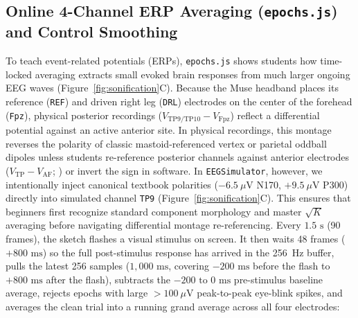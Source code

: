 \documentclass[11pt]{article}
\begin{document}
\subsection{Online 4-Channel ERP Averaging (\texttt{epochs.js}) and Control Smoothing}
To teach event-related potentials (ERPs), \texttt{epochs.js} shows students how time-locked averaging extracts small evoked brain responses from much larger ongoing EEG waves \citep{luck2014introduction,krigolson2017choosing} (Figure~\ref{fig:sonification}C). Because the Muse headband places its reference (\texttt{REF}) and driven right leg (\texttt{DRL}) electrodes on the center of the forehead (\texttt{Fpz}), physical posterior recordings ($V_{\text{TP9/TP10}} - V_{\text{Fpz}}$) reflect a differential potential against an active anterior site. In physical recordings, this montage reverses the polarity of classic mastoid-referenced vertex or parietal oddball dipoles unless students re-reference posterior channels against anterior electrodes ($V_{\text{TP}} - V_{\text{AF}}$; \citealp{krigolson2017choosing}) or invert the sign in software. In \texttt{EEGSimulator}, however, we intentionally inject canonical textbook polarities ($-6.5\ \mu\text{V}$ N170, $+9.5\ \mu\text{V}$ P300) directly into simulated channel \texttt{TP9} (Figure~\ref{fig:sonification}C). This ensures that beginners first recognize standard component morphology and master $\sqrt{K}$ averaging before navigating differential montage re-referencing. Every $1.5\text{ s}$ (90 frames), the sketch flashes a visual stimulus on screen. It then waits 48 frames ($+800\text{ ms}$) so the full post-stimulus response has arrived in the 256~Hz buffer, pulls the latest 256 samples ($1,000\text{ ms}$, covering $-200\text{ ms}$ before the flash to $+800\text{ ms}$ after the flash), subtracts the $-200\text{ to }0\text{ ms}$ pre-stimulus baseline average, rejects epochs with large $>100\ \mu\text{V}$ peak-to-peak eye-blink spikes, and averages the clean trial into a running grand average across all four electrodes:
\end{document}

